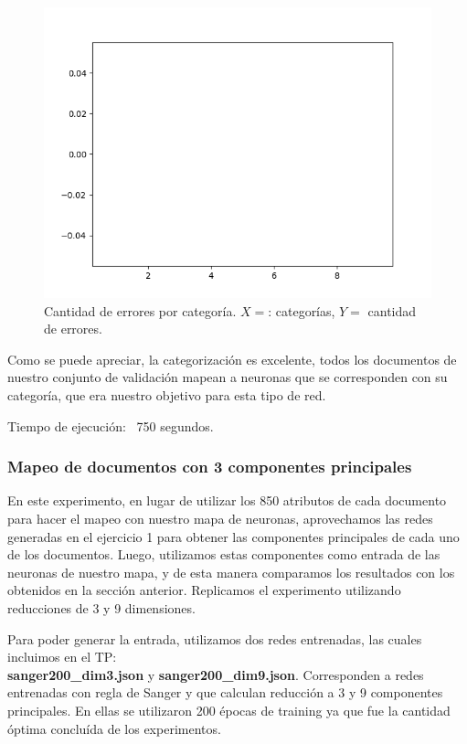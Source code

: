 \begin{figure}[!htbp]
  \begin{center}
    \includegraphics[scale=0.6]{../img/map7x7_1000ep_850en_sigma7_faseord750_corregido_errores.png}
  \caption{Cantidad de errores por categoría. $X=$: categorías, $Y=$ cantidad de errores.}
  \end{center}
\end{figure}

Como se puede apreciar, la categorización es excelente, todos los documentos de nuestro conjunto de validación mapean a neuronas que se corresponden con su categoría, que era nuestro objetivo para esta tipo de red.

Tiempo de ejecución: ~750 segundos.

\subsubsection{Mapeo de documentos con 3 componentes principales}

En este experimento, en lugar de utilizar los 850 atributos de cada documento para hacer el mapeo con nuestro mapa de neuronas, aprovechamos las redes generadas en el ejercicio 1 para obtener las componentes principales de cada uno de los documentos. Luego, utilizamos estas componentes como entrada de las neuronas de nuestro mapa, y de esta manera comparamos los resultados con los obtenidos en la sección anterior. Replicamos el experimento utilizando reducciones de 3 y 9 dimensiones.

Para poder generar la entrada, utilizamos dos redes entrenadas, las cuales incluimos en el TP:\\ \textbf{sanger200\_dim3.json} y \textbf{sanger200\_dim9.json}. Corresponden a redes entrenadas con regla de Sanger y que calculan reducción a 3 y 9 componentes principales. En ellas se utilizaron 200 épocas de training ya que fue la cantidad óptima concluída de los experimentos.


